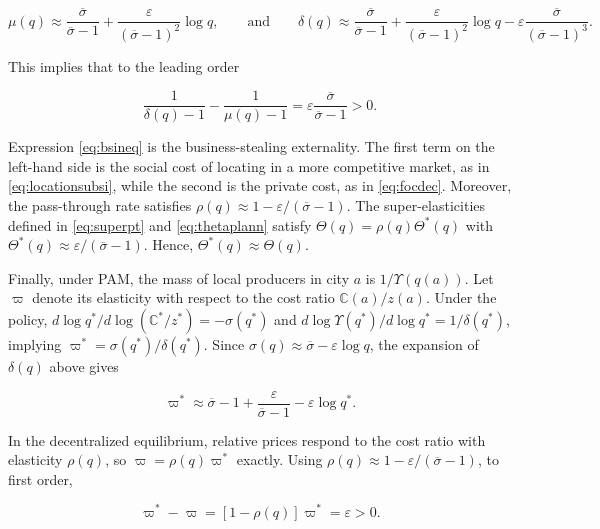 \begin{equation*}
\mu(q) \approx \frac{\overline{\sigma}}{\overline{\sigma} - 1} + \frac{\varepsilon}{(\overline{\sigma} -1)^2} \log q, \qquad \text{and} \qquad \delta(q) \approx \frac{\overline{\sigma}}{\overline{\sigma} - 1} + \frac{\varepsilon}{(\overline{\sigma} -1)^2} \log q - \varepsilon \frac{\overline{\sigma}}{(\overline{\sigma} -1)^3}.
\end{equation*}

This implies that to the leading order

\begin{equation}\label{eq:bsineq}
\frac{1}{\delta(q) - 1} - \frac{1}{\mu(q) - 1} = \varepsilon \frac{\overline{\sigma}}{\overline{\sigma} - 1} > 0.
\end{equation}

Expression \eqref{eq:bsineq} is the business-stealing externality. The first term on the left-hand side is the social cost of locating in a more competitive market, as in \eqref{eq:locationsubsi}, while the second is the private cost, as in \eqref{eq:focdec}. Moreover, the pass-through rate satisfies $\rho(q) \approx 1 - \varepsilon/(\overline{\sigma} - 1)$. The super-elasticities defined in \eqref{eq:superpt} and \eqref{eq:thetaplann} satisfy $\Theta(q) = \rho(q) \Theta^*(q)$ with $\Theta^*(q) \approx \varepsilon/(\overline{\sigma} - 1)$. Hence, $\Theta^*(q) \approx \Theta(q)$.

Finally, under PAM, the mass of local producers in city $a$ is $1/\Upsilon(q(a))$. Let $\varpi$ denote its elasticity with respect to the cost ratio $\mathbb{C}(a)/z(a)$. Under the policy, $d \log q^*/d \log (\mathbb{C}^*/z^*) = -\sigma(q^*)$ and $d \log \Upsilon(q^*)/d\log q^* = 1/\delta(q^*)$, implying $\varpi^* = \sigma(q^*)/\delta(q^*)$. Since $\sigma(q) \approx \overline{\sigma} - \varepsilon \log q$, the expansion of $\delta(q)$ above gives

\begin{equation*}
\varpi^* \approx \overline{\sigma} - 1 + \frac{\varepsilon}{\overline{\sigma} - 1} - \varepsilon \log q^*.
\end{equation*}

In the decentralized equilibrium, relative prices respond to the cost ratio with elasticity $\rho(q)$, so $\varpi = \rho(q) \varpi^*$ exactly. Using $\rho(q) \approx 1 - \varepsilon/(\overline{\sigma} - 1)$, to first order,

\begin{equation}\label{eq:respineq}
\varpi^* - \varpi = \left[1 - \rho(q)\right] \varpi^* = \varepsilon > 0.
\end{equation}

